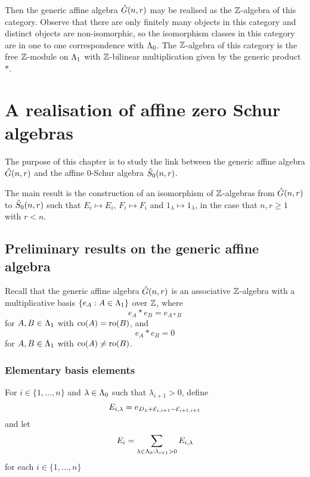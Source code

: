 \documentclass[a4paper, 11pt]{report}
\begin{document}
Then the generic affine algebra $\hat{G}(n,r)$ may be realised as the $\mathbb{Z}$-algebra of this category. Observe that there are only finitely many objects in this category and distinct objects are non-isomorphic, so the isomorphism classes in this category are in one to one correspondence with $\Lambda_0{}$. The $\mathbb{Z}$-algebra of this category is the free $\mathbb{Z}$-module on $\Lambda_1{}$ with $\mathbb{Z}$-bilinear multiplication given by the generic product $\ast$.



\chapter{A realisation of affine zero Schur algebras}

The purpose of this chapter is to study the link between the generic affine algebra $\hat{G}(n,r)$ and the affine $0$-Schur algebra $\hat{S}_0(n,r)$.

The main result is the construction of an isomorphism of $\mathbb{Z}$-algebras from $\hat{G}(n,r)$ to $\hat{S}_0(n,r)$ such that $E_i\mapsto E_i$, $F_i\mapsto F_i$ and $1_\lambda\mapsto 1_\lambda$, in the case that $n,r\geq 1$ with $r<n$.

\section{Preliminary results on the generic affine algebra}

Recall that the generic affine algebra $\hat{G}(n,r)$ is an associative $\mathbb{Z}$-algebra with a multiplicative basis $\{e_A:A\in\Lambda_1{}\}$ over $\mathbb{Z}$, where
\begin{equation*}
e_A\ast e_B = e_{A\ast B}
\end{equation*}
for $A,B\in\Lambda_1{}$ with $\operatorname{co}(A)=\operatorname{ro}(B)$, and
\begin{equation*}
e_A\ast e_B = 0
\end{equation*}
for $A,B\in\Lambda_1{}$ with $\operatorname{co}(A)\neq\operatorname{ro}(B)$.

\subsection{Elementary basis elements}

For $i\in\{1,\ldots,n\}$ and $\lambda\in\Lambda_0{}$ such that $\lambda_{i+1}>0$, define
\begin{equation*}
E_{i,\lambda} = e_{D_{\lambda} + \mathcal{E}_{i,i+1} - \mathcal{E}_{i+1,i+1}}
\end{equation*}
and let
\begin{equation*}
E_i = \sum_{\lambda\in\Lambda_0{}:\lambda_{i+1}>0} E_{i,\lambda}
\end{equation*}
for each $i\in\{1,\ldots,n\}$
\end{document}

